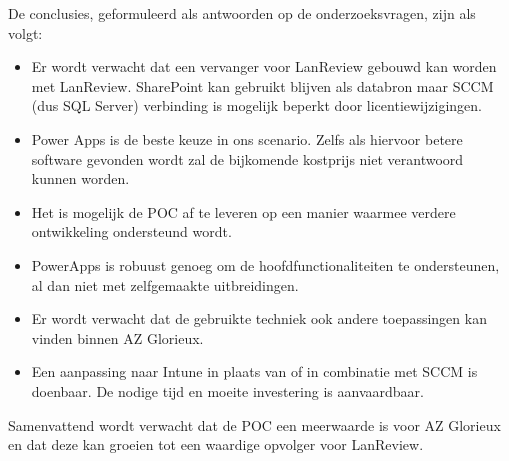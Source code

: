 De conclusies, geformuleerd als antwoorden op de onderzoeksvragen, zijn als volgt:
\begin{itemize}
    \item Er wordt verwacht dat een vervanger voor LanReview gebouwd kan worden met LanReview. SharePoint kan gebruikt blijven als databron maar SCCM (dus SQL Server) verbinding is mogelijk beperkt door licentiewijzigingen. \parencite{Microsoft2020}
    \item Power Apps is de beste keuze in ons scenario. Zelfs als hiervoor betere software gevonden wordt zal de bijkomende kostprijs niet verantwoord kunnen worden.
    \item Het is mogelijk de POC af te leveren op een manier waarmee verdere ontwikkeling ondersteund wordt.
    \item PowerApps is robuust genoeg om de hoofdfunctionaliteiten te ondersteunen, al dan niet met zelfgemaakte uitbreidingen.
    \item Er wordt verwacht dat de gebruikte techniek ook andere toepassingen kan vinden binnen AZ Glorieux.
    \item Een aanpassing naar Intune in plaats van of in combinatie met SCCM is doenbaar. De nodige tijd en moeite investering is aanvaardbaar.
\end{itemize}

\vspace{5mm}

Samenvattend wordt verwacht dat de POC een meerwaarde is voor AZ Glorieux en dat deze kan groeien tot een waardige opvolger voor LanReview. 

